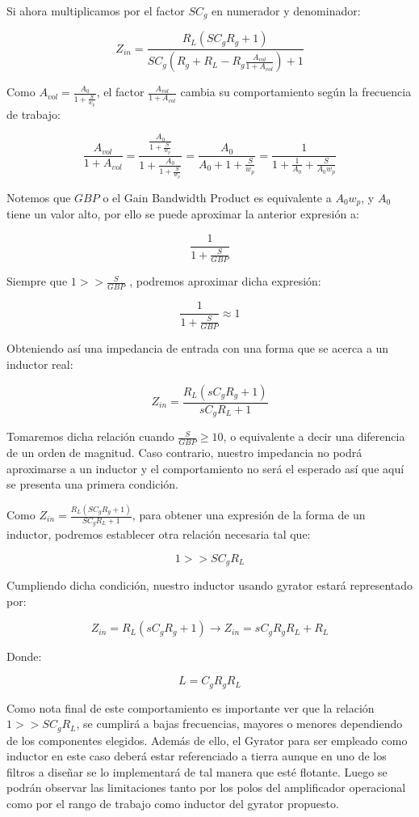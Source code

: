Si ahora multiplicamos por el factor $SC_g$ en numerador y denominador:

$$Z_{in}=\frac{R_L(SC_gR_g+1)}{SC_g(R_g+R_L-R_g\frac{A_{vol}}{1+A_{vol}})+1}$$

Como $A_{vol}=\frac{A_0}{1+\frac{S}{w_p}}$, el factor $\frac{A_{vol}}{1+A_{vol}}$ cambia su comportamiento
según la frecuencia de trabajo:

$$\frac{A_{vol}}{1+A_{vol}}=\frac{\frac{A_0}{1+\frac{S}{w_p}}}{1+\frac{A_0}{1+\frac{S}{w_p}}}=
\frac{A_0}{A_0+1+\frac{S}{w_p}}=\frac{1}{1+\frac{1}{A_0}+\frac{S}{A_0w_p}}$$

Notemos que $GBP$ o el Gain Bandwidth Product es equivalente a $A_0w_p$, y $A_0$ tiene un valor alto, por ello se puede aproximar la anterior
expresión a:

$$\frac{1}{1+\frac{S}{GBP}}$$

Siempre que $1 >> \frac{S}{GBP}$ , podremos aproximar dicha expresión:

$$\frac{1}{1+\frac{S}{GBP}} \approx 1$$

Obteniendo así una impedancia de entrada con una forma que se acerca a un inductor real:

$$Z_{in}=\frac{R_L(sC_gR_g+1)}{sC_gR_L+1}$$

Tomaremos dicha relación cuando $\frac{S}{GBP} \geq 10$, o equivalente a decir una diferencia de un orden de magnitud.
Caso contrario, nuestro impedancia no podrá aproximarse a un inductor y el comportamiento no será el esperado así que aquí se presenta 
una primera condición.

Como $Z_{in}=\frac{R_L(SC_gR_g+1)}{SC_gR_L+1}$, para obtener una expresión de la forma de un inductor,
podremos establecer otra relación necesaria tal que:

$$1 >> SC_gR_L$$

Cumpliendo dicha condición, nuestro inductor usando gyrator estará representado por:

$$Z_{in}=R_L(sC_gR_g+1)\longrightarrow Z_{in}=sC_gR_gR_L+R_L$$

Donde:

$$L=C_gR_gR_L$$

Como nota final de este comportamiento es importante ver que la relación $1 >> SC_gR_L$, se cumplirá a bajas frecuencias,
mayores o menores dependiendo de los componentes elegidos. Además de ello, el Gyrator para ser empleado como inductor en este caso deberá estar
referenciado a tierra aunque en uno de los filtros a diseñar se lo implementará de tal manera que esté flotante. Luego se podrán observar las limitaciones
tanto por los polos del amplificador operacional como por el rango de trabajo como inductor del gyrator propuesto. 


